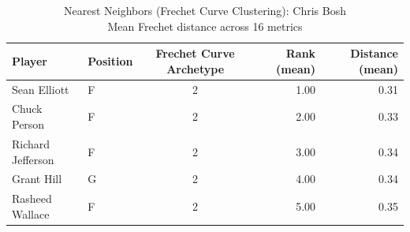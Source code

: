 \begin{table}[t]
\caption*{
{\fontsize{20}{25} Nearest Neighbors (Frechet Curve Clustering): Chris Bosh\fontsize{12}{15}\selectfont } \\ 
{\fontsize{14}{17}\selectfont  Mean Frechet distance across 16 metrics\fontsize{12}{15}\selectfont }
} 
\fontsize{12.0pt}{14.0pt}\selectfont
\begin{tabular*}{\linewidth}{@{\extracolsep{\fill}}llcrr}
\toprule
Player & Position & Frechet Curve Archetype & Rank (mean) & Distance (mean) \\ 
\midrule\addlinespace[2.5pt]
Sean Elliott & F & 2 & 1.00 & 0.31 \\ 
Chuck Person & F & 2 & 2.00 & 0.33 \\ 
Richard Jefferson & F & 2 & 3.00 & 0.34 \\ 
Grant Hill & G & 2 & 4.00 & 0.34 \\ 
Rasheed Wallace & F & 2 & 5.00 & 0.35 \\ 
\bottomrule
\end{tabular*}
\end{table}

